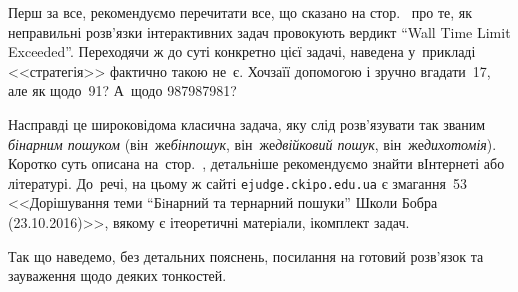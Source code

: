 \Tutorial	Перш за все, рекомендуємо перечитати все, що сказано на стор.~\pageref{text:about-wall-tle-for-interactive-tasks} про те, як неправильні розв'язки інтерактивних задач провокують вердикт ``Wall Time Limit Exceeded''. Переходячи ж до суті конкретно цієї задачі, наведена у~прикладі <<стратегія>> фактично такою не~є. 
Хоч\nolinebreak[2] за\nolinebreak[3] її допомогою і зручно вгадати~17, але як щодо~91? А~щодо 987987981?

Насправді це широковідома класична задача, 
яку слід розв'язувати так званим \emph{бінарним пошуком} 
(він~же\nolinebreak[2] \emph{бінпошук}, 
він~же\nolinebreak[2] \emph{двійковий пошук}, 
він~же\nolinebreak[2] \emph{дихотомія}).
Коротко суть описана на~стор.~\pageref{text:omnipresent-numbers-binsearch},
детальніше рекомендуємо знайти в\nolinebreak[3] Інтернеті або літературі.
До~речі, на цьому ж сайті \verb"ejudge.ckipo.edu.ua" є змагання~53 <<Дорішування теми ``Бiнарний та тернарний пошуки'' Школи Бобра (23.10.2016)>>, в\nolinebreak[3] якому є і\nolinebreak[3] теоретичні матеріали, і\nolinebreak[3] комплект задач.

Так що наведемо, без детальних пояснень, посилання на готовий розв'язок  
та зауваження щодо деяких тонкостей. 

